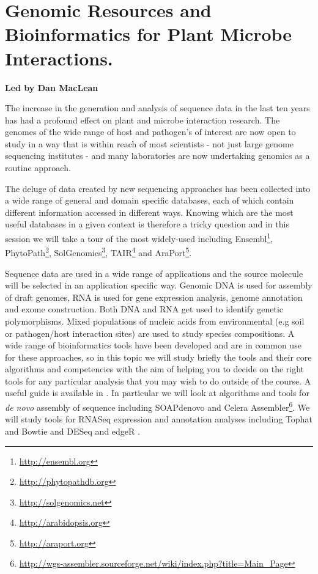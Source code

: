 \documentclass[12pt,]{book}
\let\rmarkdownfootnote\footnote%
\def\footnote{\protect\rmarkdownfootnote}
\renewcommand{\href}[2]{#2\footnote{\url{#1}}}
\begin{document}
\chapter*{Genomic Resources and Bioinformatics for Plant Microbe
Interactions.}\label{genomic-resources-and-bioinformatics-for-plant-microbe-interactions.}

\textbf{Led by Dan MacLean}

The increase in the generation and analysis of sequence data in the last
ten years has had a profound effect on plant and microbe interaction
research. The genomes of the wide range of host and pathogen's of
interest are now open to study in a way that is within reach of most
scientists - not just large genome sequencing institutes - and many
laboratories are now undertaking genomics as a routine approach.

The deluge of data created by new sequencing approaches has been
collected into a wide range of general and domain specific databases,
each of which contain different information accessed in different ways.
Knowing which are the most useful databases in a given context is
therefore a tricky question and in this session we will take a tour of
the most widely-used including \href{http://ensembl.org}{Ensembl},
\href{http://phytopathdb.org}{PhytoPath},
\href{http://solgenomics.net}{SolGenomics},
\href{http://arabidopsis.org}{TAIR} and
\href{http://araport.org}{AraPort}.

Sequence data are used in a wide range of applications and the source
molecule will be selected in an application specific way. Genomic DNA is
used for assembly of draft genomes, RNA is used for gene expression
analysis, genome annotation and exome construction. Both DNA and RNA get
used to identify genetic polymorphisms. Mixed populations of nucleic
acids from environmental (e.g soil or pathogen/host interaction sites)
are used to study species compositions. A wide range of bioinformatics
tools have been developed and are in common use for these approaches, so
in this topic we will study briefly the tools and their core algorithms
and competencies with the aim of helping you to decide on the right
tools for any particular analysis that you may wish to do outside of the
course. A useful guide is available in \citet{MacLean:2009hm}. In
particular we will look at algorithms and tools for \emph{de novo}
assembly of sequence including SOAPdenovo \citep{Luo:2012fn} and
\href{http://wgs-assembler.sourceforge.net/wiki/index.php?title=Main_Page}{Celera
Assembler}. We will study tools for RNASeq expression and annotation
analyses including Tophat \citep{Trapnell:2009dp} and Bowtie
\citep{Langmead:2012jh} and DESeq \citep{Anders:2010fu} and edgeR
\citep{Robinson:2010cw}.
\end{document}
